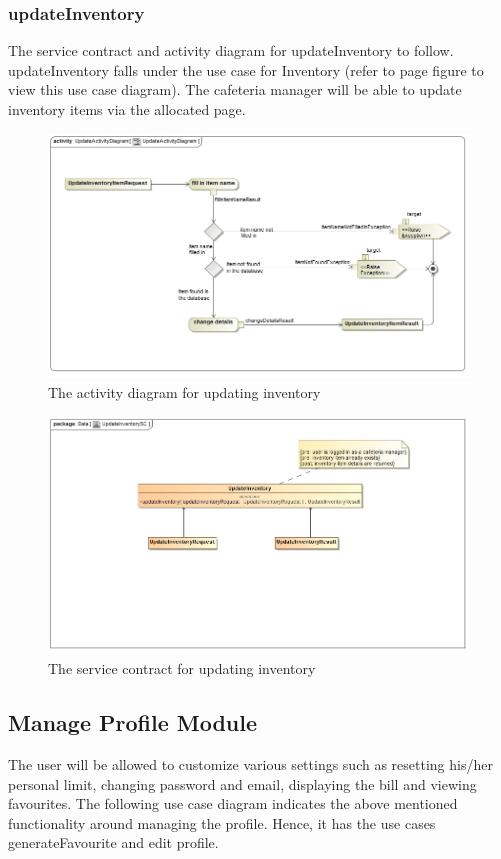 \documentclass[a4paper,12pt]{article}
\begin{document}
\subsubsection{updateInventory}
The service contract and activity diagram for updateInventory to follow. updateInventory falls under the use case for Inventory (refer to page   figure   to view this use case diagram). The cafeteria manager will be able to update inventory items via the allocated page.
\begin{figure}[H]
  \centering
    \includegraphics[width=1.0\textwidth]{../images/UpdateActivityDiagram.jpg}
    \caption{The activity diagram for updating inventory} 
\end{figure}

\begin{figure}[H]
	\centering
	\includegraphics[width=1.0\textwidth]{../images/UpdateInventorySC.jpg}
	\caption{The service contract for updating inventory}
\end{figure}

\subsection{Manage Profile Module}
 The user will be allowed to customize various settings such as resetting his/her personal limit, changing password and email, displaying the bill and viewing favourites. The following use case diagram indicates the above mentioned functionality around managing the profile. Hence, it has the use cases generateFavourite and edit profile.
\end{document}
